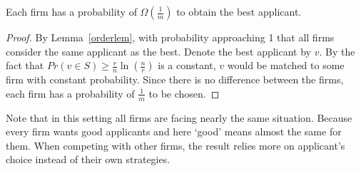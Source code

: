 \begin{corollary}
    Each firm has a probability of $\Omega(\frac{1}{m})$ to obtain
    the best applicant.
\end{corollary}

\begin{proof}
By Lemma~\ref{orderlem}, with probability approaching 1 that all firms consider the same applicant as the best.
Denote the best applicant by $v$. By the fact that $Pr(v \in S) \ge \frac{r}{n} \ln(\frac{n}{r})$ is a constant,
$v$ would be matched to some firm with constant probability.
Since there is no difference between the firms, each firm has a probability of $\frac{1}{m}$ to be chosen.
\end{proof}

Note that in this setting all firms are facing nearly the same situation.
Because every firm wants good applicants and here `good' means
almost the same for them.
When competing with other firms, the result relies more on applicant's
choice instead of their own strategies.

